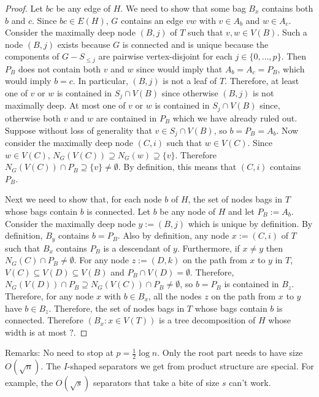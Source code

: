 \documentclass{patmorin}
\renewcommand{\le}{\leqslant}
\begin{document}
\begin{proof}
  Let $bc$ be any edge of $H$. We need to show that some bag $B_x$ contains both $b$ and $c$.  Since $bc\in E(H)$, $G$ contains an edge $vw$ with $v\in A_b$ and $w\in A_c$.  Consider the maximally deep node $(B,j)$ of $T$ such that $v,w\in V(B)$.  Such a node $(B,j)$ exists because $G$ is connected and is unique because the components of $G-S_{\le j}$ are pairwise vertex-disjoint for each $j\in\{0,\ldots,p\}$. Then $P_B$ does not contain both $v$ and $w$ since would imply that $A_b=A_c=P_B$, which would imply $b=c$.  In particular, $(B,j)$ is not a leaf of $T$. Therefore, at least one of $v$ or $w$ is contained in $S_j\cap V(B)$ since otherwise $(B,j)$ is not maximally deep.  At most one of $v$ or $w$ is contained in $S_j\cap V(B)$ since, otherwise both $v$ and $w$ are contained in $P_{B}$ which we have already ruled out.  Suppose without loss of generality that $v\in S_j\cap V(B)$, so $b=P_B=A_b$.  Now consider the maximally deep node $(C,i)$ such that $w\in V(C)$.  Since $w\in V(C)$, $N_G(V(C))\supseteq N_G(w)\supseteq\{v\}$.  Therefore $N_G(V(C))\cap P_B\supseteq\{v\}\neq\emptyset$. By definition, this means that $(C,i)$ contains $P_B$.

  Next we need to show that, for each node $b$ of $H$, the set of nodes bags in $T$ whose bags contain $b$ is connected.  Let $b$ be any node of $H$ and let $P_B:=A_b$.  Consider the maximally deep node $y:=(B,j)$ which is unique by definition. By definition, $B_y$ contains $b=P_B$.  Also by definition, any node $x:=(C,i)$ of $T$ such that $B_x$ contains $P_B$ is a descendant of $y$. Furthermore, if $x\neq y$ then $N_G(C)\cap P_B\neq\emptyset$.  For any node $z:=(D,k)$ on the path from $x$ to $y$ in $T$, $V(C)\subseteq V(D)\subseteq V(B)$ and $P_B\cap V(D)=\emptyset$.  Therefore, $N_G(V(D))\cap P_B\supseteq N_G(V(C))\cap P_B\neq\emptyset$, so $b=P_B$ is contained in $B_z$.  Therefore, for any node $x$ with $b\in B_x$, all the nodes $z$ on the path from $x$ to $y$ have $b\in B_z$.  Therefore, the set of nodes bags in $T$ whose bags contain $b$ is connected.  Therefore $(B_x:x\in V(T))$ is a tree decomposition of $H$ whose width is at most $?$.
\end{proof}

Remarks: No need to stop at $p=\tfrac12\log n$.  Only the root part needs to have size $O(\sqrt{n})$.  The $I$-shaped separators we get from product structure are special.  For example, the $O(\sqrt{s})$ separators that take a bite of size $s$ can't work.
\end{document}
